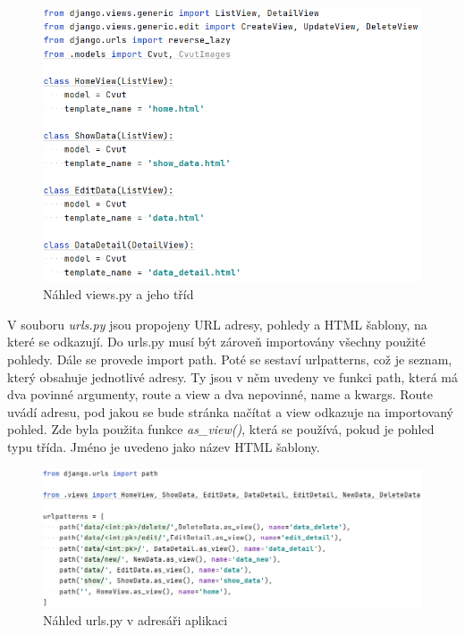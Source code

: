 \begin{figure}[H] \centering
    \includegraphics[width=350pt]{./pictures/6-nahled-views-aplikace.PNG}
    \caption[Náhled views.py a jeho tříd]{Náhled views.py a jeho tříd}
	\label{fig:Náhled views.py a jeho tříd}              
\end{figure}


V souboru \emph{urls.py} jsou propojeny URL adresy, pohledy a HTML
šablony, na které se odkazují. Do urls.py musí být zároveň importovány
všechny použité pohledy. Dále se provede import path. Poté se
sestaví urlpatterns, což je seznam, který obsahuje jednotlivé
adresy. Ty jsou v něm uvedeny ve funkci path, která má dva povinné
argumenty, route a view a dva nepovinné, name a kwargs. Route uvádí
adresu, pod jakou se bude stránka načítat a view odkazuje na
importovaný pohled. Zde byla použita funkce \emph{as\_view()}, která
se používá, pokud je pohled typu třída. Jméno je uvedeno jako název
HTML šablony.

\begin{figure}[H] \centering
    \includegraphics[width=450pt]{./pictures/7-urls-aplikace.PNG}
    \caption[Náhled urls.py v adresáři aplikaci]{Náhled urls.py v adresáři aplikaci}
	\label{fig:Náhled urls.py v adresáři aplikaci}              
\end{figure}

